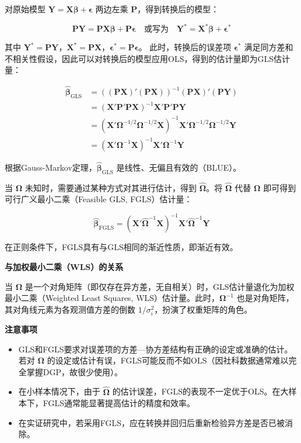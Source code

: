 对原始模型 $\bm{Y} = \bm{X}\bm{\beta} + \bm{\epsilon}$ 两边左乘 $\bm{P}$，得到转换后的模型：

\begin{equation}
	\bm{P}\bm{Y} = \bm{P}\bm{X}\bm{\beta} + \bm{P}\bm{\epsilon}
	\quad \text{或写为} \quad \bm{Y}^* = \bm{X}^*\bm{\beta} + \bm{\epsilon}^*
\end{equation}

其中 $\bm{Y}^*=\bm{P}\bm{Y}$，$\bm{X}^*=\bm{P}\bm{X}$，$\bm{\epsilon}^*=\bm{P}\bm{\epsilon}$。
此时，转换后的误差项 $\bm{\epsilon}^*$ 满足同方差和不相关性假设，因此可以对转换后的模型应用OLS，得到的估计量即为GLS估计量：

\begin{equation}
	\begin{split}
		\hat{\bm{\beta}}_{\mathrm{GLS}} &= ((\bm{P}\bm{X})'(\bm{P}\bm{X}))^{-1}(\bm{P}\bm{X})'(\bm{P}\bm{Y}) \\
		&= (\bm{X}'\bm{P}'\bm{P}\bm{X})^{-1}\bm{X}'\bm{P}'\bm{P}\bm{Y} \\
		&= (\bm{X}'\bm{\Omega}^{-1/2}\bm{\Omega}^{-1/2}\bm{X})^{-1}\bm{X}'\bm{\Omega}^{-1/2}\bm{\Omega}^{-1/2}\bm{Y} \\
		&= (\bm{X}'\bm{\Omega}^{-1}\bm{X})^{-1}\bm{X}'\bm{\Omega}^{-1}\bm{Y}
	\end{split}
\end{equation}

根据Gauss-Markov定理，$\hat{\bm{\beta}}_{\mathrm{GLS}}$ 是线性、无偏且有效的（BLUE）。

当 $\bm{\Omega}$ 未知时，需要通过某种方式对其进行估计，得到 $\hat{\bm{\Omega}}$。将 $\hat{\bm{\Omega}}$ 代替 $\bm{\Omega}$ 即可得到可行广义最小二乘（Feasible GLS, FGLS）估计量：

\begin{equation}
	\hat{\bm{\beta}}_{\mathrm{FGLS}} = (\bm{X}'\hat{\bm{\Omega}}^{-1}\bm{X})^{-1}\bm{X}'\hat{\bm{\Omega}}^{-1}\bm{Y}
\end{equation}

在正则条件下，FGLS具有与GLS相同的渐近性质，即渐近有效。

\textbf{与加权最小二乘（WLS）的关系}

当 $\bm{\Omega}$ 是一个对角矩阵（即仅存在异方差，无自相关）时，GLS估计量退化为加权最小二乘（Weighted Least Squares, WLS）估计量。此时，$\bm{\Omega}^{-1}$ 也是对角矩阵，其对角线元素为各观测值方差的倒数 $1/\sigma_i^2$，扮演了权重矩阵的角色。

\textbf{注意事项}
\begin{itemize}
\item GLS和FGLS要求对误差项的方差—协方差结构有正确的设定或准确的估计。若对 $\bm{\Omega}$ 的设定或估计有误，FGLS可能反而不如OLS（因社科数据通常难以完全掌握DGP，故很少使用）。
\item 在小样本情况下，由于 $\hat{\bm{\Omega}}$ 的估计误差，FGLS的表现不一定优于OLS。在大样本下，FGLS通常能显著提高估计的精度和效率。
\item 在实证研究中，若采用FGLS，应在转换并回归后重新检验异方差是否已被消除。
\end{itemize}

